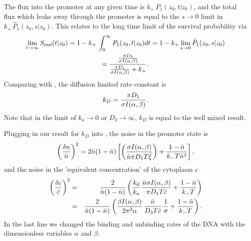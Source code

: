 The flux into the promoter at any given time is $k_+\,P_1(z_0,t|z_0)$, and the total flux which leaks away through the promoter is equal to the $s \to 0$ limit in $k_+ \,\hat{P}_1(z_0,s|z_0)$. This relates to the long time limit of the survival probability via
\begin{gather}
  \lim_{t \to \infty}S_{\rm rad}(t|z_0) = 1 - k_+ \, \int_0^{\infty} P_1(z_0, t|z_0) dt = 1 - k_+ \lim_{s \to 0} \hat{P}_1(z_0, s|z_0) \\
= \frac{\frac{\pi D_1}{\sigma I(\alpha,\beta)}}{\frac{\pi D_1}{\sigma I(\alpha,\beta)} + k_+}.
\end{gather}
Comparing with , the diffusion limited rate constant is
\begin{equation}
 k_D = \frac{\pi D_1}{\sigma I(\alpha,\beta)}.
 \elabel{kDFullJ}
\end{equation}
Note that in the limit of $k_a\to0$ or $D_3\to\infty$, $k_D$ is equal to the well mixed result.

Plugging in our result for $k_D$ into , the noise in the promoter state is
\begin{equation}
 \elabel{NoiseProFull}
 \left( \frac{\delta n}{\bar{n}} \right)^2 = 2 \bar{n}(1-\bar{n})\left[\left( \frac{\sigma I(\alpha,\beta)}{\bar{n} \pi D_1 T \bar{\xi}} \right)+\frac{1-\bar{n}}{k_- T \bar{n}^2} \right],
\end{equation}
and the noise in the 'equivalent concentration' of the cytoplasm $c$
\begin{eqnarray}
 \elabel{NoiseCFull} 
 \left( \frac{\delta c}{\bar{c}} \right)^2 & = & \frac{2}{\bar{n}(1-\bar{n})} \left( \frac{k_d}{k_a} \, \frac{\bar{n} \sigma I(\alpha,\beta)}{\pi D_1 T \bar{c}} + \frac{1-\bar{n}}{k_- T}  \right) \\
 \elabel{NoiseCFull2}
 & = & \frac{2}{\bar{n}(1-\bar{n})} \left( \frac{\beta I(\alpha,\beta)}{2 \pi^2 \alpha} \, \frac{\bar{n}}{D_3 T \bar{c}} \, \frac{1}{\sigma} + \frac{1-\bar{n}}{k_- T}  \right).
\end{eqnarray}
In the last line we changed the binding and unbinding rates of the DNA with the dimensionless variables $\alpha$ and $\beta$.


